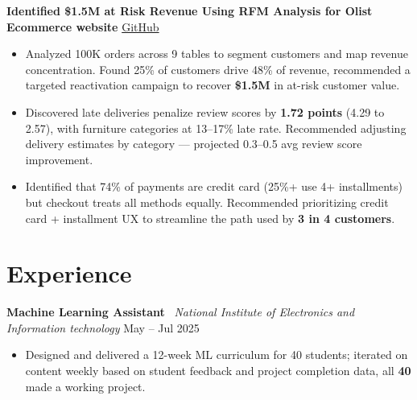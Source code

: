 \documentclass[a4paper,11pt]{article}
\begin{document}
\vspace{5pt}


\textbf{Identified \$1.5M at Risk Revenue Using RFM Analysis for Olist Ecommerce website}
\hfill
\href{https://github.com/MujtabaJ30/SQL-Product-Analytics}{GitHub}

\begin{itemize}[nosep,leftmargin=1em,itemsep=7pt]

\item Analyzed 100K orders across 9 tables to segment customers and map revenue concentration. Found 25\% of customers drive 48\% of revenue, recommended a targeted reactivation campaign to recover \textbf{\$1.5M} in at-risk customer value.

\item Discovered late deliveries penalize review scores by \textbf{1.72 points} (4.29 to 2.57), with furniture categories at 13--17\% late rate. Recommended adjusting delivery estimates by category — projected 0.3--0.5 avg review score improvement.

\item Identified that 74\% of payments are credit card (25\%+ use 4+ installments) but checkout treats all methods equally. Recommended prioritizing credit card + installment UX to streamline the path used by \textbf{3 in 4 customers}.

\end{itemize}

\vspace{5pt}


\section{Experience}

\textbf{Machine Learning Assistant} \textemdash\ \textit{National Institute of Electronics and Information technology}
\hfill May -- Jul 2025
\begin{itemize}[nosep,leftmargin=1em,itemsep=7pt]

\item Designed and delivered a 12-week ML curriculum for 40 students; iterated on content weekly based on student feedback and project completion data, all \textbf{40} made a working project.

\end{itemize}
\end{document}
